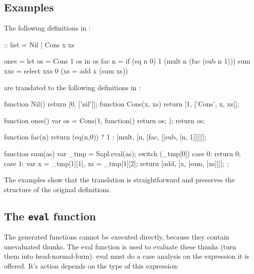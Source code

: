 \subsection{Examples}
The following definitions in \Sapl:
\begin{CleanCode}
:: list = Nil | Cons x xs	

ones = let os = Cons 1 os in os
fac n = if (eq n 0) 1 (mult n (fac (sub n 1)))
sum xxs = select xxs 0 (\x xs = add x (sum xs))
\end{CleanCode}
%
are translated to the following definitions in \JS:
\begin{CleanCode}
function Nil() { return [0, ['nil']]; }
function Cons(x, xs) { return [1, ['Cons', x, xs]]; }

function ones() { var os = Cons(1, function() { return os; }); return os; }

function fac(n) {
    return (eq(n,0)) ? 1 : [mult, [n, [fac, [[sub, [n, 1]]]]]];
}

function sum(as) {
	var _tmp = Sapl.eval(as);
	switch (_tmp[0]) {
		case 0: return 0;
		case 1: var x = _tmp[1][1], xs = _tmp[1][2]; 
				return [add, [x, [sum, [xs]]]];
	};
}

\end{CleanCode}
The examples show that the translation is straightforward and preserves the
structure of the original definitions.

\subsection{The \texttt{eval} function}
\label{eval}
The generated \JS functions cannot be executed directly, because they contain unevaluated thunks.
The \textsf{eval} function is used to evaluate these thunks (turn them into head-normal-form).
\textsf{eval} must do a case analysis on the expression it is offered.
It's action depends on the type of  this expression:

